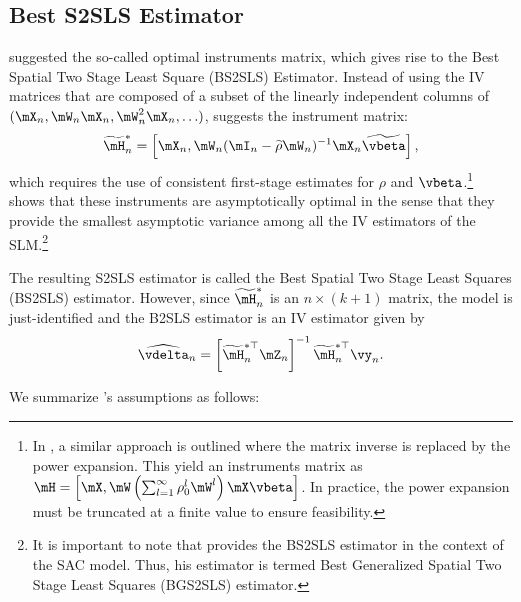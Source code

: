 \documentclass[english,12pt]{book}\usepackage[]{graphicx}\usepackage[]{xcolor}
\begin{document}
\subsection{Best S2SLS Estimator}\label{sec:BS2SLS}

\cite{lee2003best} suggested the so-called optimal instruments matrix, which gives rise to the Best Spatial Two Stage Least Square (BS2SLS) Estimator. Instead of using the IV matrices that are composed of a subset of the linearly independent columns of $(\mX_n, \mW_n\mX_n, \mW^2_n\mX_n, \ldots)$, \cite{lee2003best} suggests the instrument matrix:
\begin{equation*}
\widetilde{\mH}^{*}_n =\left[\mX_n, \mW_n(\mI_n - \widetilde{\rho}\mW_n)^{-1}\mX_n\widetilde{\vbeta}\right],
\end{equation*}
%
which requires the use of consistent first-stage estimates for $\rho$ and $\vbeta$.\footnote{In \cite{Keliejian2004}, a similar approach is outlined where the matrix inverse is replaced by the power expansion. This yield an instruments matrix as $\mH =\left[\mX, \mW\left(\sum_{l = 1}^{\infty}\rho_0^{l}\mW^l\right)\mX\vbeta\right]$. In practice, the power expansion must be truncated at a finite value to ensure feasibility.} \cite{lee2003best} shows that these instruments are asymptotically optimal in the sense that they provide the smallest asymptotic variance among all the IV estimators of the SLM.\footnote{It is important to note that \cite{lee2003best} provides the BS2SLS estimator in the context of the SAC model. Thus, his estimator is termed Best Generalized Spatial Two Stage Least Squares (BGS2SLS) estimator. }

The resulting S2SLS estimator is called the Best Spatial Two Stage Least Squares (BS2SLS) estimator. However, since $\widetilde{\mH}^{*}_n$ is an $n \times (k + 1)$ matrix, the model is just-identified and the B2SLS estimator is an IV estimator given by
\begin{equation}\label{eq:bs2sls-estimator}
\widehat{\vdelta}_n = \left[\widetilde{\mH}^{*\top}_n\mZ_n\right]^{-1}\widetilde{\mH}^{*\top}_n\vy_n.
\end{equation}

We summarize \cite{lee2003best}'s assumptions as follows:
\end{document}
